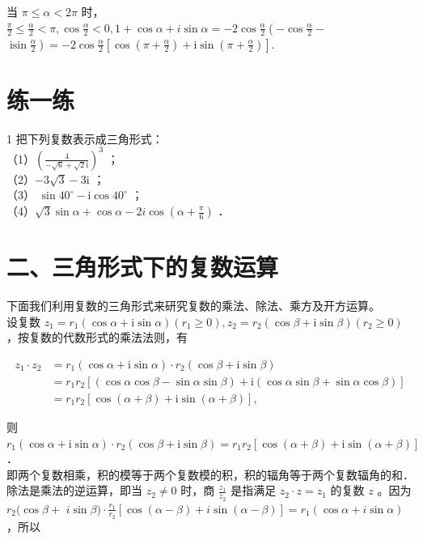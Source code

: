 \documentclass[10pt]{article}
\begin{document}
当 \(\pi \leqslant \alpha<2 \pi\) 时，\(\frac{\pi}{2} \leqslant \frac{\alpha}{2}<\pi, \cos \frac{\alpha}{2}<0,1+\cos \alpha+i \sin \alpha=-2 \cos \frac{\alpha}{2}\left(-\cos \frac{\alpha}{2}-\right.\) \(\left.\operatorname{isin} \frac{\alpha}{2}\right)=-2 \cos \frac{\alpha}{2}\left[\cos \left(\pi+\frac{\alpha}{2}\right)+\mathrm{i} \sin \left(\pi+\frac{\alpha}{2}\right)\right]\).

\section*{练一练}
1 把下列复数表示成三角形式：\\
（1）\(\left(\frac{4}{-\sqrt{6}+\sqrt{2} \mathrm{i}}\right)^{3}\) ；\\
（2）\(-3 \sqrt{3}-3 \mathrm{i}\) ；\\
（3） \(\sin 40^{\circ}-\mathrm{i} \cos 40^{\circ}\) ；\\
（4）\(\sqrt{3} \sin \alpha+\cos \alpha-2 i \cos \left(\alpha+\frac{\pi}{6}\right)\) ．

\section*{二、三角形式下的复数运算}
下面我们利用复数的三角形式来研究复数的乘法、除法、乘方及开方运算。\\
设复数 \(z_{1}=r_{1}(\cos \alpha+\mathrm{i} \sin \alpha)\left(r_{1} \geqslant 0\right), z_{2}=r_{2}(\cos \beta+\mathrm{i} \sin \beta)\left(r_{2} \geqslant 0\right)\) ，按复数的代数形式的乘法法则，有

\[
\begin{aligned}
z_{1} \cdot z_{2} & =r_{1}(\cos \alpha+\mathrm{i} \sin \alpha) \cdot r_{2}(\cos \beta+\mathrm{i} \sin \beta) \\
& =r_{1} r_{2}[(\cos \alpha \cos \beta-\sin \alpha \sin \beta)+\mathrm{i}(\cos \alpha \sin \beta+\sin \alpha \cos \beta)] \\
& =r_{1} r_{2}[\cos (\alpha+\beta)+\mathrm{i} \sin (\alpha+\beta)],
\end{aligned}
\]

则 \(r_{1}(\cos \alpha+\mathrm{i} \sin \alpha) \cdot r_{2}(\cos \beta+\mathrm{i} \sin \beta)=r_{1} r_{2}[\cos (\alpha+\beta)+\mathrm{i} \sin (\alpha+\beta)]\) ．\\
即两个复数相乘，积的模等于两个复数模的积，积的辐角等于两个复数辐角的和．\\
除法是乘法的逆运算，即当 \(z_{2} \neq 0\) 时，商 \(\frac{z_{1}}{z_{2}}\) 是指满足 \(z_{2} \cdot z=z_{1}\) 的复数 \(z\) 。因为 \(r_{2}(\cos \beta+\) \(i \sin \beta) \cdot \frac{r_{1}}{r_{2}}[\cos (\alpha-\beta)+i \sin (\alpha-\beta)]=r_{1}(\cos \alpha+i \sin \alpha)\) ，所以
\end{document}

